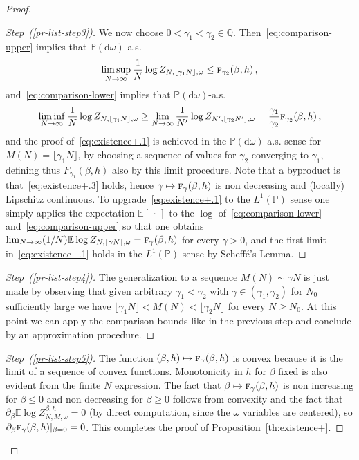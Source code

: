 \documentclass[AHL,Unicode,longabstracts]{cedram}
\newenvironment{step}[1]{\begin{proof}[#1]}{\let\qed\relax\end{proof}}
\newenvironment{laststep}[1]{\begin{proof}[#1]}{\end{proof}}
\newcommand{\gb}{\beta}
\newcommand{\go}{\omega}
\newcommand{\dd}{\mathrm{d}}
\newcommand{\tf}{\textsc{f}} %
\newcommand{\bbE}{\ensuremath{\mathbb{E}}}
\newcommand{\bbP}{\ensuremath{\mathbb{P}}}
\newcommand{\bbQ}{\ensuremath{\mathbb{Q}}}
\begin{document}
\begin{proof}
\begin{step}{Step~(\ref{pr-list-step3})}
We now choose $0<\gamma_1<\gamma_2 \in \bbQ$. Then~\eqref{eq:comparison-upper} implies that $\bbP(\dd \go)$-a.s.
\begin{equation}\label{eq:fclb1}
\limsup_{N \to \infty} \frac{1}{N} \log Z_{N, \lfloor \gamma_1 N \rfloor, \go} \le \tf_{\gamma_2} (\gb, h)\,,
\end{equation}
and~\eqref{eq:comparison-lower} implies that $\bbP(\dd \go)$-a.s.
\begin{equation}\label{eq:fclb2}
\liminf_{N \to \infty} \frac{1}{N} \log Z_{N, \lfloor \gamma_1 N \rfloor, \go} \ge
\lim_{N \to \infty} \frac{1}{N'}\log Z_{N', \lfloor \gamma_2 N' \rfloor, \go}= \frac{\gamma_1}{\gamma_2}
\tf_{\gamma_2}(\gb, h)
\,,
\end{equation}
and the proof of~\eqref{eq:existence+.1} is achieved in the $\bbP(\dd \go)$-a.s. sense for $M(N)= \lfloor\gamma_1 N \rfloor$, by choosing a sequence of values for $\gamma_2$ converging to $\gamma_1$, defining thus $F_{\gamma_1}(\gb, h)$ also by this limit procedure. Note that a byproduct is that~\eqref{eq:existence+.3} holds, hence $\gamma\mapsto \tf_\gamma(\gb, h)$ is non decreasing and (locally) Lipschitz continuous. To upgrade~\eqref{eq:existence+.1} to the $L^1(\bbP)$ sense one simply applies the expectation $\bbE[{\,\cdot\,}]$ to the $\log$ of~\eqref{eq:comparison-lower} and~\eqref{eq:comparison-upper} so that one obtains $\lim_{N \to \infty} (1/N) \bbE\log Z_{N, \lfloor \gamma N \rfloor, \go} = \tf_{\gamma}(\gb, h)$ for every $\gamma>0$, and the first limit in~\eqref{eq:existence+.1} holds in the $L^1(\bbP)$ sense by Scheffé's Lemma.
\end{step}



\begin{step}{Step~(\ref{pr-list-step4})}
The generalization to a sequence $M(N)\sim \gamma N$ is just made by observing that given arbitrary $\gamma_1< \gamma_2$ with $\gamma \in (\gamma_1, \gamma_2)$ for $N_0$ sufficiently large we have $\lfloor \gamma_1 N \rfloor < M(N) < \lfloor \gamma_2 N \rfloor$ for every $N \ge N_0$. At this point we can apply the comparison bounds like in the previous step and conclude by an approximation procedure.
\end{step}


\begin{laststep}{Step~(\ref{pr-list-step5})}
The function $(\beta,h) \mapsto \tf_\gamma(\beta,h)$ is convex because it is the limit of a sequence of convex functions. Monotonicity in $h$ for $\gb$ fixed is also evident from the finite $N$ expression. The fact that $\gb \mapsto \tf_\gamma(\beta,h)$ is non increasing for $\gb \le 0$ and non decreasing for $\gb \ge 0$ follows from convexity and the fact that $\partial _\gb \bbE \log Z_{N,M,\omega}^{\beta,h}=0$ (by direct computation, since the $\go$ variables are centered), so $\partial_\gb \tf_\gamma(\beta,h) \vert_{\gb=0}=0$. This completes the proof of Proposition~\ref{th:existence+}.
\end{laststep}
\let\qed\relax
\end{proof}
\goodbreak
\end{document}
